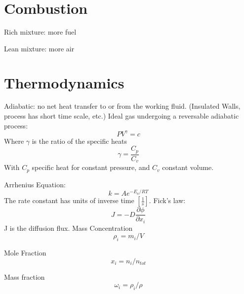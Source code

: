 \documentclass{article}
\begin{document}
\section{Combustion}

Rich mixture: more fuel
\newline
\newline

Lean mixture: more air



%
%
\newpage
\section{Thermodynamics}

Adiabatic: no net heat transfer to or from the working fluid. (Insulated Walls, process has short time scale, etc.)
\newline
\newline
Ideal gas undergoing a reversable adiabatic process: 
\begin{equation}
  PV^{\gamma} = c
\end{equation}
Where $\gamma$ is the ratio of the specific heats
\begin{equation}
  \gamma = \frac{C_p}{C_v}
\end{equation}
With $C_p$ specific heat for constant pressure, and $C_v$ constant volume.

Arrhenius Equation:
\begin{equation} 
 k = Ae^{-E_a/RT}
\end{equation}
The rate constant has units of inverse time $[\frac{1}{s}]$.
\newline
\newline
Fick's law:
\begin{equation} 
 J = -D\frac{\partial \phi}{\partial x_i}
\end{equation}
J is the diffusion flux. 
\newline
\newline
Mass Concentration
\begin{equation} 
  \rho_i = m_i / V 
\end{equation}

Mole Fraction
\begin{equation} 
  x_i = n_i / n_{tot}
\end{equation}

Mass fraction
\begin{equation} 
 \omega_i = \rho_i / \rho
\end{equation}
\end{document}
